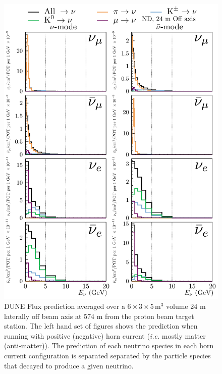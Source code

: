 \documentclass{article}
\begin{document}
\begin{figure}
  \includegraphics[width=\textwidth]{plots/fluxpredcompvar/ND_HadronParentFluxComponents_24m_offaxis}
  \caption{DUNE Flux prediction averaged over a $6\times 3\times 5\,\textrm{m}^{3}$ volume 24 m laterally off beam axis at 574 m from the proton beam target station. The left hand set of figures shows the prediction when running with positive (negative) horn current (\textit{i.e.} mostly matter (anti-matter)). The prediction of each neutrino species in each horn current configuration is separated separated by the particle species that decayed to produce a given neutrino.}
\end{figure}
\end{document}
